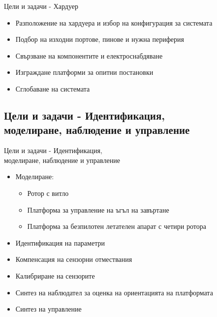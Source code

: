 \documentclass[handout]{beamer}
\begin{document}
\begin{frame}{Цели и задачи - Хардуер}
	\begin{itemize}
		\pause 
		\item Разположение на хардуера и избор на конфигурация за системата 

		\pause 
		\item Подбор на изходни портове, пинове и нужна периферия

		\pause
		\item Свързване на компонентите и електроснабдяване

		\pause 
		\item Изграждане платформи за опитни постановки

		\pause 
		\item Сглобаване на системата

	\end{itemize}
\end{frame}

\subsection{Цели и задачи - Идентификация,\\ моделиране, наблюдение и управление}


\begin{frame}{Цели и задачи -  Идентификация,\\ моделиране, наблюдение и управление }
	\begin{itemize}
		\pause 
		\item Моделиране:

		\begin{itemize}
			\pause 
			\item Ротор с витло

			\pause 
			\item Платформа за управление на ъгъл на завъртане

			\pause 
			\item Платформа за безпилотен летателен апарат с четири ротора

		\end{itemize}
		\pause 
		\item Идентификация на параметри

		\pause 
		\item Компенсация на сензорни отмествания

		\pause
		\item Калибриране на сензорите

		\pause
		\item Синтез на наблюдател за оценка на ориентацията на платформата

		\pause 
		\item Синтез на управление
	\end{itemize}
\end{frame}
\end{document}
